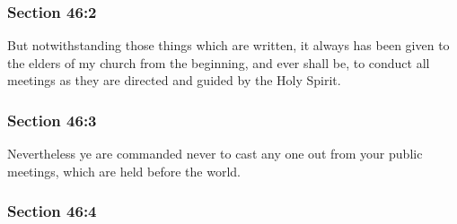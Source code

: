 
	\subsubsection{Section 46:2} %
		\label{DC46-2}

		But notwithstanding those things which are written, it always has been given to the elders of my church from the beginning, and ever shall be, to conduct all meetings as they are directed and guided by the Holy Spirit.


	\subsubsection{Section 46:3} %
		\label{DC46-3}

		Nevertheless ye are commanded never to cast any one out from your public meetings, which are held before the world.


	\subsubsection{Section 46:4} %
		\label{DC46-4}

